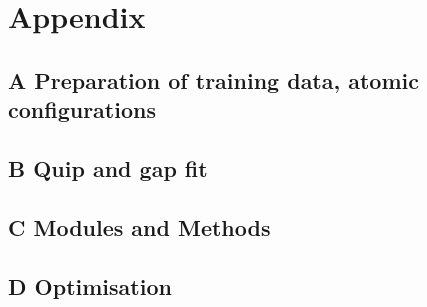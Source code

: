 \chapter{Appendix}

\section{A Preparation of training data, atomic configurations}
\section{B Quip and gap fit}
\section{C Modules and Methods}
\section{D Optimisation}

